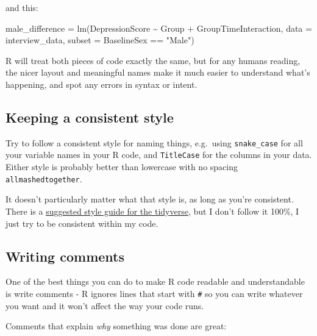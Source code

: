 \documentclass[
]{book}
\newenvironment{Shaded}{\begin{snugshade}}{\end{snugshade}}
\newcommand{\AttributeTok}[1]{\textcolor[rgb]{0.77,0.63,0.00}{#1}}
\newcommand{\CommentTok}[1]{\textcolor[rgb]{0.56,0.35,0.01}{\textit{#1}}}
\newcommand{\DecValTok}[1]{\textcolor[rgb]{0.00,0.00,0.81}{#1}}
\newcommand{\FunctionTok}[1]{\textcolor[rgb]{0.00,0.00,0.00}{#1}}
\newcommand{\NormalTok}[1]{#1}
\newcommand{\OtherTok}[1]{\textcolor[rgb]{0.56,0.35,0.01}{#1}}
\newcommand{\SpecialCharTok}[1]{\textcolor[rgb]{0.00,0.00,0.00}{#1}}
\newcommand{\StringTok}[1]{\textcolor[rgb]{0.31,0.60,0.02}{#1}}
\begin{document}
and this:

\begin{Shaded}
\begin{Highlighting}[]
\NormalTok{male\_difference }\OtherTok{=} \FunctionTok{lm}\NormalTok{(DepressionScore }\SpecialCharTok{\textasciitilde{}}\NormalTok{ Group }\SpecialCharTok{+}\NormalTok{ GroupTimeInteraction,}
                     \AttributeTok{data =}\NormalTok{ interview\_data,}
                     \AttributeTok{subset =}\NormalTok{ BaselineSex }\SpecialCharTok{==} \StringTok{"Male"}\NormalTok{)}
\end{Highlighting}
\end{Shaded}

R will treat both pieces of code exactly the same, but for any humans reading,
the nicer layout and meaningful names make it much easier to understand
what's happening, and spot any errors in syntax or intent.

\hypertarget{keeping-a-consistent-style}{%
\subsection{Keeping a consistent style}\label{keeping-a-consistent-style}}

Try to follow a consistent style for naming things, e.g.~using \texttt{snake\_case}
for all your variable names in your R code, and \texttt{TitleCase} for the
columns in your data. Either style is probably better than lowercase with
no spacing \texttt{allmashedtogether}.

It doesn't particularly matter what that style is, as long as you're
consistent. There is a \href{https://style.tidyverse.org/}{suggested style guide for the tidyverse},
but I don't follow it 100\%, I just try to be consistent within my code.

\hypertarget{writing-comments}{%
\subsection{Writing comments}\label{writing-comments}}

One of the best things you can do to make R code readable and
understandable is write comments - R ignores lines that start with
\texttt{\#} so you can write whatever you want and it won't affect
the way your code runs.

Comments that explain \emph{why} something was done are great:

\begin{Shaded}
\end{Shaded}
\end{document}
